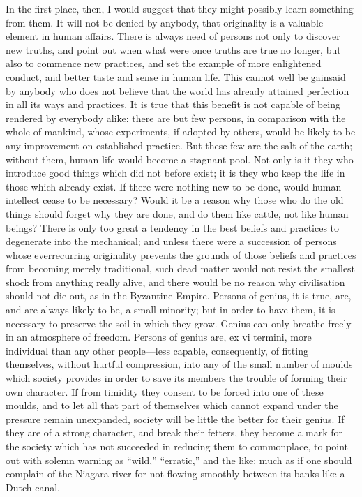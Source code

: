 \documentclass[11pt,openany]{book}
\begin{document}
In the first place, then, I would suggest that they might possibly learn something from them. It will not be denied by anybody, that originality is a valuable element in human affairs. There is always need of persons not only to discover new truths, and point out when what were once truths are true no longer, but also to commence new practices, and set the example of more enlightened conduct, and better taste and sense in human life. This cannot well be gainsaid by anybody who does not believe that the world has already attained perfection in all its ways and practices. It is true that this benefit is not capable of being rendered by everybody alike: there are but few persons, in comparison with the whole of mankind, whose experiments, if adopted by others, would be likely to be any improvement on established practice. But these few are the salt of the earth; without them, human life would become a stagnant pool. Not only is it they who introduce good things which did not before exist; it is they who keep the life in those which already exist. If there were nothing new to be done, would human intellect cease to be necessary? Would it be a reason why those who do the old things should forget why they are done, and do them like cattle, not like human beings? There is only too great a tendency in the best beliefs and practices to degenerate into the mechanical; and unless there were a succession of persons whose everrecurring originality prevents the grounds of those beliefs and practices from becoming merely traditional, such dead matter would not resist the smallest shock from anything really alive, and there would be no reason why civilisation should not die out, as in the Byzantine Empire. Persons of genius, it is true, are, and are always likely to be, a small minority; but in order to have them, it is necessary to preserve the soil in which they grow. Genius can only breathe freely in an atmosphere of freedom. Persons of genius are, ex vi termini, more individual than any other people---less capable, consequently, of fitting themselves, without hurtful compression, into any of the small number of moulds which society provides in order to save its members the trouble of forming their own character. If from timidity they consent to be forced into one of these moulds, and to let all that part of themselves which cannot expand under the pressure remain unexpanded, society will be little the better for their genius. If they are of a strong character, and break their fetters, they become a mark for the society which has not succeeded in reducing them to commonplace, to point out with solemn warning as ``wild,'' ``erratic,'' and the like; much as if one should complain of the Niagara river for not flowing smoothly between its banks like a Dutch canal.
\end{document}
